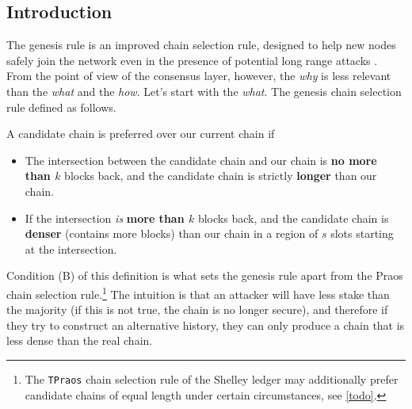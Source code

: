 \subsection{Introduction}

The genesis rule is an improved chain selection rule, designed to help new nodes
safely join the network even in the presence of potential long range attacks
\cite{cryptoeprint:2018:378}. From the point of view of the consensus layer,
however, the \emph{why} is less relevant than the \emph{what} and the
\emph{how}. Let's start with the \emph{what}. The genesis chain selection
rule defined as follows.

\begin{definition}
\label{genesis:originalrule}
A candidate chain is preferred over our current chain if

\begin{itemize}
\item The intersection between the candidate chain and our chain is \textbf{no
more than $k$} blocks back, and the candidate chain is strictly \textbf{longer}
than our chain.

\item If the intersection \emph{is} \textbf{more than $k$} blocks back, and the
candidate chain is \textbf{denser} (contains more blocks) than our chain in
a region of $s$ slots starting at the intersection.
\end{itemize}
\end{definition}

Condition (B) of this definition is what sets the genesis rule apart from the
Praos chain selection rule.\footnote{The \lstinline!TPraos! chain selection rule
of the Shelley ledger may additionally prefer candidate chains of equal length
under certain circumstances, see \cref{todo}.} The intuition is that an attacker
will have less stake than the majority (if this is not true, the chain is no
longer secure), and therefore if they try to construct an alternative history,
they can only produce a chain that is less dense than the real chain.

